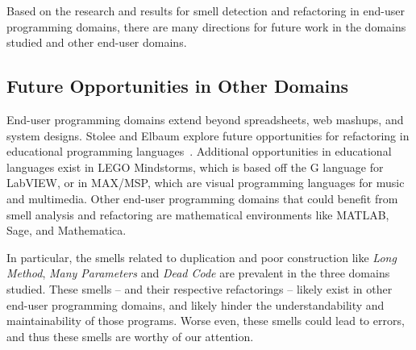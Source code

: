 \documentclass[10pt,conference,compsocconf]{IEEEtran}
\begin{document}
Based on the research and results for smell detection and refactoring in end-user programming domains, there are many directions for future work in the domains studied and other end-user domains.

\subsection{Future Opportunities in Other Domains}
End-user programming domains extend beyond spreadsheets, web mashups, and system designs.
Stolee and Elbaum explore future opportunities for refactoring in educational programming languages~\cite{StoleeTSE2013}.
Additional opportunities in educational languages exist in LEGO Mindstorms, which is based off the G language for LabVIEW, or in MAX/MSP, which are visual programming languages for music and multimedia.
Other end-user programming domains that could benefit from smell analysis and refactoring are mathematical environments like MATLAB, Sage, and Mathematica.

In particular, the smells related to duplication and poor construction like \emph{Long Method}, \emph{Many Parameters} and \emph{Dead Code} are prevalent in the three domains studied.
These smells -- and their respective refactorings -- likely exist in other end-user programming domains, and likely hinder the understandability and maintainability of those programs.
Worse even, these smells could lead to errors, and thus these smells are worthy of our attention. 


\end{document}
